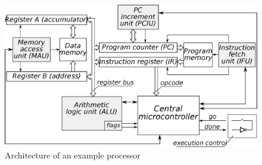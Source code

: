 \begin{figure}
\begin{centering}
\includegraphics[width=1.04\columnwidth]{fig/processor_architecture}
\par\end{centering}

\caption{Architecture of an example processor\label{app-fig-Architecture-of-example}}
\vspace{-6mm}
\end{figure}


